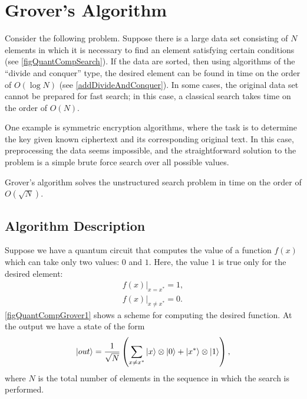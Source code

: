 \section{Grover's Algorithm}
Consider the following problem. Suppose there is a large data set
consisting of $N$ elements in which it is necessary to find an element
satisfying certain conditions (see \autoref{figQuantCompSearch}).
If the data are sorted, then using algorithms of the ``divide and conquer'' type,
the desired element can be found in time on the order of $O\left(\log N\right)$
(see \autoref{addDivideAndConquer}). In some cases, the original data set
cannot be prepared for fast search; in this case,
a classical search takes time on the order of $O\left(N\right)$.



One example is symmetric encryption algorithms, 
where the task is to determine the key given known ciphertext
and its corresponding original text. In this case,
preprocessing the data seems impossible, and the straightforward
solution to the problem is a simple brute force search over all possible values.

Grover's algorithm \cite{Grover96afast} solves the
unstructured search problem in time on the order of $O\left(\sqrt{N}\right)$.

\subsection{Algorithm Description}

Suppose we have a quantum circuit that computes the value
of a function $f\left(x\right)$ which can take only two values:
$0$ and $1$. Here, the value $1$ is true only for the desired
element:
\begin{eqnarray}
\left.f\left(x\right)\right|_{x = x^{\ast}} = 1,
\nonumber \\
\left.f\left(x\right)\right|_{x \ne x^{\ast}} = 0.
\label{eqQuantCompGroverF}
\end{eqnarray}
\autoref{figQuantCompGrover1} shows a scheme for computing
the desired function. At the output we have a state of the form
\begin{equation}
\ket{out} = \frac{1}{\sqrt{N}}\left(
 \sum_{x \ne x^{\ast}} \ket{x}\otimes\ket{0}
+ \left|x^{\ast}\right>\otimes\ket{1}
\right),
\label{eqQuantCompGroverFake}
\end{equation}
where $N$ is the total number of elements in the sequence in which
the search is performed.

